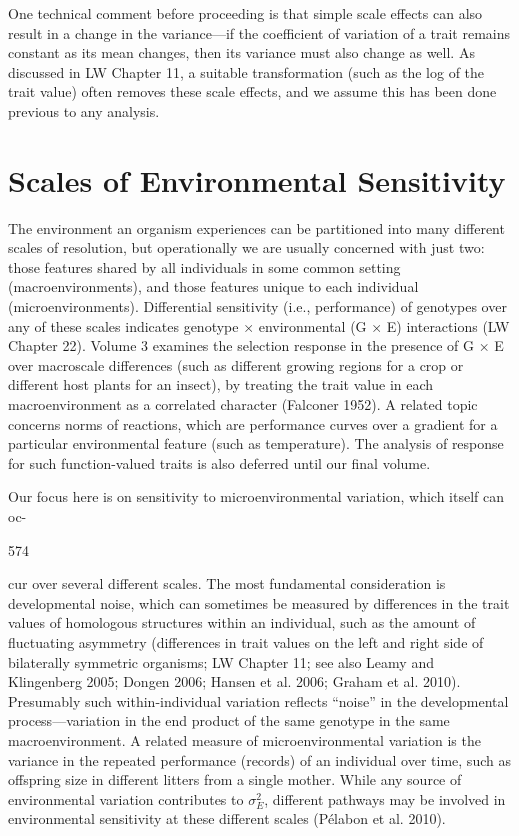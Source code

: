 \documentclass{article}
\begin{document}
One technical comment before proceeding is that simple scale effects can also result in a change in the variance—if the coefficient of variation of a trait remains constant as its mean changes, then its variance must also change as well. As discussed in LW Chapter 11, a suitable transformation (such as the log of the trait value) often removes these scale effects, and we assume this has been done previous to any analysis.

\section{Scales of Environmental Sensitivity}
The environment an organism experiences can be partitioned into many different scales of resolution, but operationally we are usually concerned with just two: those features shared by all individuals in some common setting (macroenvironments), and those features unique to each individual (microenvironments). Differential sensitivity (i.e., performance) of genotypes over any of these scales indicates genotype × environmental (G × E) interactions (LW Chapter 22). Volume 3 examines the selection response in the presence of G × E over macroscale differences (such as different growing regions for a crop or different host plants for an insect), by treating the trait value in each macroenvironment as a correlated character (Falconer 1952). A related topic concerns norms of reactions, which are performance curves over a gradient for a particular environmental feature (such as temperature). The analysis of response for such function-valued traits is also deferred until our final volume.

Our focus here is on sensitivity to microenvironmental variation, which itself can oc-

574

cur over several different scales. The most fundamental consideration is developmental noise, which can sometimes be measured by differences in the trait values of homologous structures within an individual, such as the amount of fluctuating asymmetry (differences in trait values on the left and right side of bilaterally symmetric organisms; LW Chapter 11; see also Leamy and Klingenberg 2005; Dongen 2006; Hansen et al. 2006; Graham et al. 2010). Presumably such within-individual variation reflects “noise” in the developmental process—variation in the end product of the same genotype in the same macroenvironment. A related measure of microenvironmental variation is the variance in the repeated performance (records) of an individual over time, such as offspring size in different litters from a single mother. While any source of environmental variation contributes to  $ \sigma_{E}^{2} $, different pathways may be involved in environmental sensitivity at these different scales (Pélabon et al. 2010).
\end{document}
